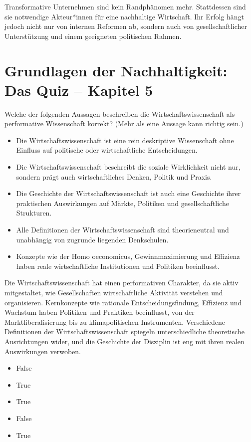 \documentclass[
  nswissgerman,
  a4paper,
  DIV=11,
  numbers=noendperiod,
  oneside,
  openany]{scrreprt}
\providecommand{\tightlist}{%
  \setlength{\itemsep}{0pt}\setlength{\parskip}{0pt}}
\begin{document}
Transformative Unternehmen sind kein Randphänomen mehr. Stattdessen sind
sie notwendige Akteur*innen für eine nachhaltige Wirtschaft. Ihr Erfolg
hängt jedoch nicht nur von internen Reformen ab, sondern auch von
gesellschaftlicher Unterstützung und einem geeigneten politischen
Rahmen.

\section{Grundlagen der Nachhaltigkeit: Das Quiz -- Kapitel
5}\label{grundlagen-der-nachhaltigkeit-das-quiz-kapitel-5}

Welche der folgenden Aussagen beschreiben die Wirtschaftswissenschaft
als performative Wissenschaft korrekt? (Mehr als eine Aussage kann
richtig sein.)

\begin{itemize}
\tightlist
\item[$\square$]
  Die Wirtschaftswissenschaft ist eine rein deskriptive Wissenschaft
  ohne Einfluss auf politische oder wirtschaftliche Entscheidungen.
\item[$\square$]
  Die Wirtschaftswissenschaft beschreibt die soziale Wirklichkeit nicht
  nur, sondern prägt auch wirtschaftliches Denken, Politik und Praxis.
\item[$\square$]
  Die Geschichte der Wirtschaftswissenschaft ist auch eine Geschichte
  ihrer praktischen Auswirkungen auf Märkte, Politiken und
  gesellschaftliche Strukturen.
\item[$\square$]
  Alle Definitionen der Wirtschaftswissenschaft sind theorieneutral und
  unabhängig von zugrunde liegenden Denkschulen.
\item[$\square$]
  Konzepte wie der Homo oeconomicus, Gewinnmaximierung und Effizienz
  haben reale wirtschaftliche Institutionen und Politiken beeinflusst.
\end{itemize}

Die Wirtschaftswissenschaft hat einen performativen Charakter, da sie
aktiv mitgestaltet, wie Gesellschaften wirtschaftliche Aktivität
verstehen und organisieren. Kernkonzepte wie rationale
Entscheidungsfindung, Effizienz und Wachstum haben Politiken und
Praktiken beeinflusst, von der Marktliberalisierung bis zu
klimapolitischen Instrumenten. Verschiedene Definitionen der
Wirtschaftswissenschaft spiegeln unterschiedliche theoretische
Ausrichtungen wider, und die Geschichte der Disziplin ist eng mit ihren
realen Auswirkungen verwoben.

\begin{itemize}
\tightlist
\item
  False
\item
  True
\item
  True
\item
  False
\item
  True
\end{itemize}
\end{document}
